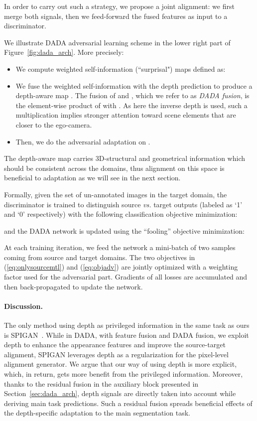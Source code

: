 \documentclass[10pt,twocolumn,letterpaper]{article}
\begin{document}
In order to carry out such a strategy, we propose a joint alignment:  we first merge  both signals, then we feed-forward the fused features as input to a discriminator.  

We illustrate DADA adversarial learning scheme in the lower right part of Figure~\ref{fig:dada_arch}.
More precisely:
\begin{itemize}
	\setlength{\parskip}{0pt}
	\setlength{\itemsep}{1pt}
    \item  We compute weighted self-information (``surprisal") maps \cite{vu2018advent}  defined as: 
    
	\item We fuse the weighted self-information  with the depth prediction  to produce a depth-aware map .
	The fusion of  and , which we refer to as \textit{DADA fusion}, is the element-wise product of   with .
	As here the inverse depth is used, such a multiplication implies stronger attention toward scene elements that are closer to the ego-camera.
	\item Then, we do the adversarial adaptation on .
\end{itemize}



The depth-aware map  carries 3D-structural and geometrical information which should be consistent across the domains, thus alignment on this space is beneficial to adaptation as we will see in the next section.

Formally, given  the set of un-annotated images in the target domain, the discriminator  is trained to distinguish source \textit{vs.} target outputs (labeled as `1' and `0' respectively) with the following classification objective minimization:

and the DADA network is updated using the ``fooling'' objective minimization:


At each training iteration, we feed the network a mini-batch of two samples coming from source and target domains.
The two objectives in (\ref{eq:onlysourcemtl}) and (\ref{eq:objadv}) are jointly optimized with a weighting factor  used for the adversarial part.
Gradients of all losses are accumulated and then back-propagated to update the network.

\vspace{-0.3cm}\paragraph{Discussion.} The only method using depth as privileged information in the same task as ours is SPIGAN~\cite{lee2018spigan}.
While in DADA, with feature fusion and DADA fusion, we exploit depth to enhance the appearance features and improve the source-target alignment, SPIGAN leverages depth as a regularization for the pixel-level alignment generator.
We argue that our way of using depth is more explicit, which, in return, gets more benefit from the privileged information.
Moreover, thanks to the residual fusion in the auxiliary block presented in Section~\ref{sec:dada_arch}, depth signals are directly taken into account while deriving main task predictions.
Such a residual fusion spreads beneficial effects of the depth-specific adaptation to the main segmentation task. 	
\end{document}
